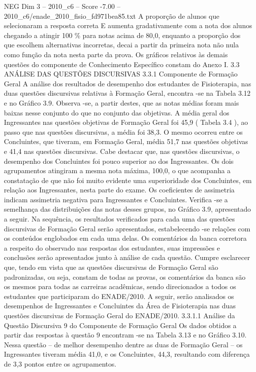 \begin{textsample}{NEG Dim 3 – 2010\_c6 – Score -7.00 – 2010\_c6/enade\_2010\_fisio\_fd971bea85.txt}
A proporção de alunos que selecionaram a resposta correta E aumenta gradativamente com a nota dos alunos chegando a atingir 100 \% para notas acima de 80,0, enquanto a proporção dos que escolhem alternativas incorretas, decai a partir da primeira nota não nula como função da nota nesta parte da prova.
Os gráficos relativos às demais questões do componente de Conhecimento Específico constam do Anexo I. 3.3 ANÁLISE DAS QUESTÕES DISCURSIVAS 3.3.1 Componente de Formação Geral A análise dos resultados de desempenho dos estudantes de Fisioterapia, nas duas questões discursivas relativas à Formação Geral, encontra -se na Tabela 3.12 e no Gráfico 3.9.
Observa -se, a partir destes, que as notas médias foram mais baixas nesse conjunto do que no conjunto das objetivas.
A média geral dos Ingressantes nas questões objetivas de Formação Geral foi 45,9 ( Tabela 3.4 ), ao passo que nas questões discursivas, a média foi 38,3.
O mesmo ocorreu entre os Concluintes, que tiveram, em Formação Geral, média 51,7 nas questões objetivas e 41,4 nas questões discursivas.
Cabe destacar que, nas questões discursivas, o desempenho dos Concluintes foi pouco superior ao dos Ingressantes.
Os dois agrupamentos atingiram a mesma nota máxima, 100,0, o que acompanha a constatação de que não foi muito evidente uma superioridade dos Concluintes, em relação aos Ingressantes, nesta parte do exame.
Os coeficientes de assimetria indicam assimetria negativa para Ingressantes e Concluintes.
Verifica -se a semelhança das distribuições das notas desses grupos, no Gráfico 3.9, apresentado a seguir.
Na sequência, os resultados verificados para cada uma das questões discursivas de Formação Geral serão apresentados, estabelecendo -se relações com os conteúdos englobados em cada uma delas.
Os comentários da banca corretora a respeito do observado nas respostas dos estudantes, suas impressões e conclusões serão apresentados junto à análise de cada questão.
Cumpre esclarecer que, tendo em vista que as questões discursivas de Formação Geral são padronizadas, ou seja, constam de todas as provas, os comentários da banca são os mesmos para todas as carreiras acadêmicas, sendo direcionados a todos os estudantes que participaram do ENADE/2010.
A seguir, serão analisados os desempenhos de Ingressantes e Concluintes da Área de Fisioterapia nas duas questões discursivas de Formação Geral do ENADE/2010. 3.3.1.1 Análise da Questão Discursiva 9 do Componente de Formação Geral Os dados obtidos a partir das respostas à questão 9 encontram -se na Tabela 3.13 e no Gráfico 3.10.
Nessa questão – de melhor desempenho dentre as duas de Formação Geral – os Ingressantes tiveram média 41,0, e os Concluintes, 44,3, resultando com diferença de 3,3 pontos entre os agrupamentos.

\end{textsample}
